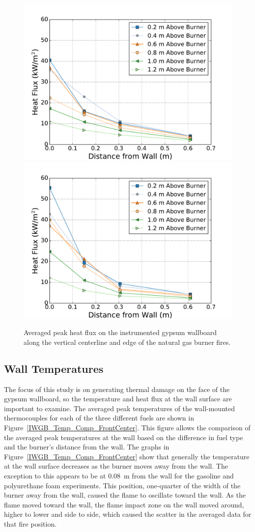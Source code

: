 \documentclass[twoside]{uocthesis}
\begin{document}
{\begin{figure}[ht!]
	\centering
	\includegraphics[width=.625\columnwidth]{../Figures/IWGB_NG_HF_Center_Avg}\\
	\includegraphics[width=.625\columnwidth]{../Figures/IWGB_NG_HF_Offset_Avg}\\
	\caption[Averaged peak heat flux on the instrumented gypsum wallboard for the natural gas burner fires.]{Averaged peak heat flux on the instrumented gypsum wallboard along the vertical centerline and edge of the natural gas burner fires.}
	\label{IWGB_NG_HF_CandEAvg}
\end{figure}

\clearpage

\subsection{Wall Temperatures}

The focus of this study is on generating thermal damage on the face of the gypsum wallboard, so the temperature and heat flux at the wall surface are important to examine.  The averaged peak temperatures of the wall-mounted thermocouples for each of the three different fuels are shown in Figure~\ref{IWGB_Temp_Comp_FrontCenter}. This figure allows the comparison of the averaged peak temperatures at the wall based on the difference in fuel type and the burner's distance from the wall.  The graphs in Figure~\ref{IWGB_Temp_Comp_FrontCenter} show that generally the temperature at the wall surface decreases as the burner moves away from the wall.  The exception to this appears to be at 0.08~m from the wall for the gasoline and polyurethane foam experiments.  This position, one-quarter of the width of the burner away from the wall, caused the flame to oscillate toward the wall. As the flame moved toward the wall, the flame impact zone on the wall moved around, higher to lower and side to side, which caused the scatter in the averaged data for that fire position.    

}
\end{document}
